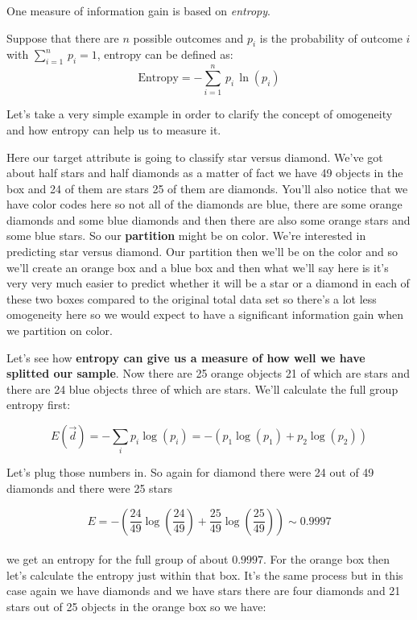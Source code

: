 \documentclass{article}
\begin{document}
One measure of information gain is based on \emph{entropy}.

Suppose that there are \(n\) possible outcomes and \(p_i\) is the
probability of outcome \(i\) with \(\sum\limits_{i=1}^n\, p_i=1\),
entropy can be defined as:
\[\text{Entropy}=-\sum\limits_{i=1}^n\, p_i \,\ln(p_i)\]

    Let's take a very simple example in order to clarify the concept of
omogeneity and how entropy can help us to measure it.

    

    Here our target attribute is going to classify star versus diamond.
We've got about half stars and half diamonds as a matter of fact we have
49 objects in the box and 24 of them are stars 25 of them are diamonds.
You'll also notice that we have color codes here so not all of the
diamonds are blue, there are some orange diamonds and some blue diamonds
and then there are also some orange stars and some blue stars. So our
\textbf{partition} might be on color. We're interested in predicting
star versus diamond. Our partition then we'll be on the color and so
we'll create an orange box and a blue box and then what we'll say here
is it's very very much easier to predict whether it will be a star or a
diamond in each of these two boxes compared to the original total data
set so there's a lot less omogeneity here so we would expect to have a
significant information gain when we partition on color.

    

    Let's see how \textbf{entropy can give us a measure of how well we have
splitted our sample}. Now there are 25 orange objects 21 of which are
stars and there are 24 blue objects three of which are stars. We'll
calculate the full group entropy first:

\[E(\vec d) = -\sum_i p_i \log(p_i) =  -(p_1 \log(p_1) + p_2 \log(p_2))\]

Let's plug those numbers in. So again for diamond there were 24 out of
49 diamonds and there were 25 stars

\[E=-\left(\frac{24}{49}\log\left(\frac{24}{49}\right) + \frac{25}{49} \log\left(\frac{25}{49}\right)\right) \sim 0.9997\]\\
we get an entropy for the full group of about \(0.9997\). For the orange
box then let's calculate the entropy just within that box. It's the same
process but in this case again we have diamonds and we have stars there
are four diamonds and 21 stars out of 25 objects in the orange box so we
have:
\end{document}
